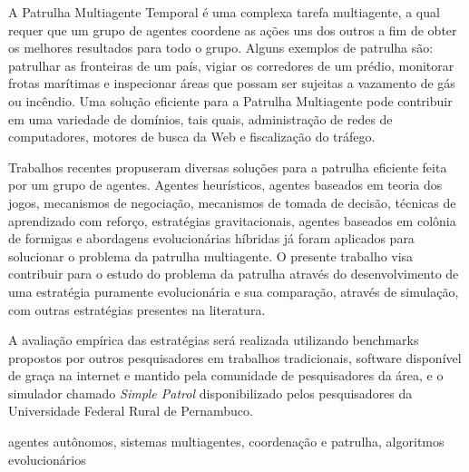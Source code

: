 A Patrulha Multiagente Temporal é uma complexa tarefa multiagente, a qual 
requer que um grupo de agentes coordene as ações uns dos outros a fim de 
obter os melhores resultados para todo o grupo. Alguns exemplos de patrulha 
são: patrulhar as fronteiras de um país, vigiar os corredores de um prédio, 
monitorar frotas marítimas e inspecionar áreas que possam ser sujeitas a 
vazamento de gás ou incêndio. Uma solução eficiente para a Patrulha 
Multiagente pode contribuir em uma variedade de domínios, tais quais, 
administração de redes de computadores, motores de busca da Web e 
fiscalização do tráfego.

Trabalhos recentes propuseram diversas soluções para a patrulha eficiente 
feita por um grupo de agentes. Agentes heurísticos, agentes baseados em 
teoria dos jogos, mecanismos de negociação, mecanismos de tomada de decisão, 
técnicas de aprendizado com reforço, estratégias gravitacionais, agentes 
baseados em colônia de formigas e abordagens evolucionárias híbridas já foram 
aplicados para solucionar o problema da patrulha multiagente. O presente 
trabalho visa contribuir para o estudo do problema da patrulha através do 
desenvolvimento de uma estratégia puramente evolucionária e sua comparação, 
através de simulação, com outras estratégias presentes na literatura.

A avaliação empírica das estratégias será realizada utilizando benchmarks 
propostos por outros pesquisadores em trabalhos tradicionais, software 
disponível de graça na internet e mantido pela comunidade de pesquisadores da 
área, e o simulador chamado \textit{Simple Patrol} disponibilizado pelos pesquisadores 
da Universidade Federal Rural de Pernambuco.

\begin{keywords}
agentes autônomos, sistemas multiagentes, coordenação e patrulha, algoritmos 
evolucionários
\end{keywords}